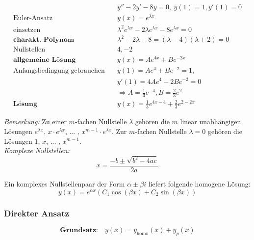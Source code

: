 \begin{equation*}
\begin{split}
& y'' - 2y' - 8y = 0,\ y(1) = 1, y'(1) = 0 \\
\text{Euler-Ansatz}\quad & y(x) = e^{\lambda x} \\
\text{einsetzen}\quad & \lambda^2 e^{\lambda x} - 2\lambda e^{\lambda x} - 8e^{\lambda x} = 0 \\
\textbf{charakt. Polynom}\quad & \lambda^2 - 2\lambda - 8 = (\lambda - 4)(\lambda + 2) = 0 \\
\text{Nullstellen}\quad & 4, -2 \\
\textbf{allgemeine L{\"o}sung}\quad & y(x) = Ae^{4x} + Be^{-2x} \\
\text{Anfangsbedingung gebrauchen}\quad & y(1) = Ae^4 + Be^{-2} =1,\\ &y'(1) = 4Ae^4 - 2Be^{-2} = 0 \\
& \Rightarrow A = \frac{1}{3}e^{-4}, B = \frac{2}{3}e^2 \\
\textbf{L{\"o}sung}\quad & y(x) = \frac{1}{3}e^{4x-4} + \frac{2}{3}e^{2-2x}
\end{split}
\end{equation*}

\emph{Bemerkung:} Zu einer $m$-fachen Nullstelle $\lambda$ geh{\"o}ren die $m$ linear unabh{\"a}ngigen L{\"o}sungen $e^{\lambda x}$, $x\cdot e^{\lambda x}$, ... , $x^{m-1}\cdot e^{\lambda x}$. Zur $m$-fachen Nullstelle $\lambda = 0$ geh{\"o}ren die L{\"o}sungen $1$, $x$, ... , $x^{m-1}$. \\

\emph{Komplexe Nullstellen:} \\

\begin{equation*}
x = \frac{-b \pm \sqrt{b^2-4ac}}{2a}
\end{equation*}

Ein komplexes Nullstellenpaar der Form $\alpha \pm \beta i$ liefert folgende homogene L{\"o}sung:
\begin{equation*}
y(x)=e^{\alpha x}(C_1\cos(\beta x) + C_2\sin(\beta x))
\end{equation*}



\subsubsection{Direkter Ansatz}

\begin{equation*}
\textbf{Grundsatz:}\quad y(x) = y_\text{homo}(x) + y_p(x)
\end{equation*}

